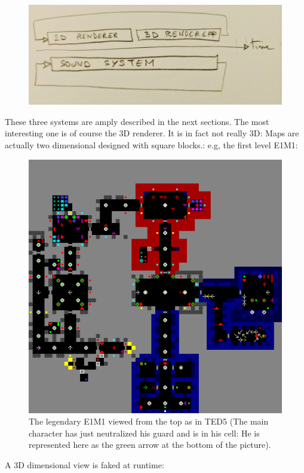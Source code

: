 \documentclass[book.tex]{subfiles}
\begin{document}
\par
\begin{figure}[H]
\centering
 \includegraphics[width=\textwidth]{imgs/three_systems.png}
 \end{figure}
 \par

 
These three systems are amply described in the next sections. The most interesting one is of course the 3D renderer. It is in fact not really 3D: Maps are actually two dimensional designed with square blocks.: e.g, the first level E1M1:\par
\begin{figure}[H]
  \centering
 \includegraphics[width=\textwidth]{imgs/e1m1.png}
 \caption{The legendary E1M1 viewed from the top as in TED5 (The main character has just neutralized his guard and is in his cell: He is represented here as the green arrow at the bottom of the picture).}
\end{figure}
\par 
A 3D dimensional view is faked at runtime:
\end{document}
